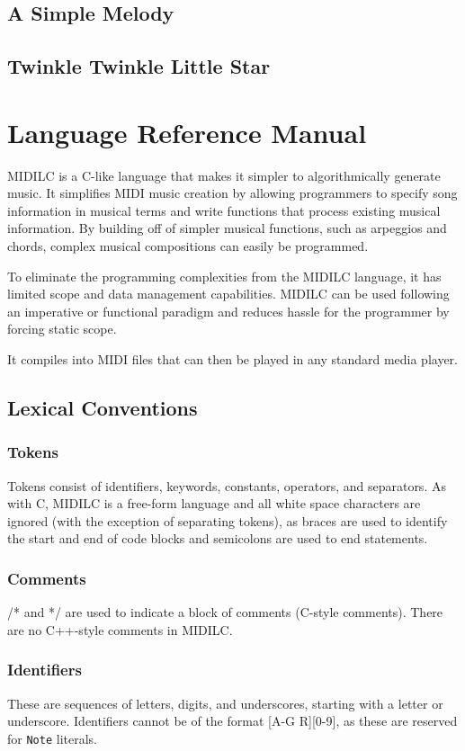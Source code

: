 \documentclass[12pt,A4]{book}
\begin{document}
\section{A Simple Melody}
\section{Twinkle Twinkle Little Star}
\chapter{Language Reference Manual}
MIDILC is a C-like language that makes it simpler to algorithmically generate music.  It simplifies MIDI music creation by allowing programmers to specify song information in musical terms and write functions that process existing musical information.  By building off of simpler musical functions, such as arpeggios and chords, complex musical compositions can easily be programmed.

To eliminate the programming complexities from the MIDILC language, it has limited scope and data management capabilities.  MIDILC can be used following an imperative or functional paradigm and reduces hassle for the programmer by forcing static scope.

It compiles into MIDI files that can then be played in any standard media player.

\section{Lexical Conventions}
\subsection{Tokens}
Tokens consist of identifiers, keywords, constants, operators, and separators.  As with C, MIDILC is a free-form language and all white space characters are ignored (with the exception of separating tokens), as braces are used to identify the start and end of code blocks and semicolons are used to end statements.
\subsection{Comments}
/* and */ are used to indicate a block of comments (C-style comments).  There are no C++-style comments in MIDILC.
\subsection{Identifiers}
These are sequences of letters, digits, and underscores, starting with a letter or underscore.  Identifiers cannot be of the format [A-G R][0-9], as these are reserved for \verb|Note| literals.
\end{document}
